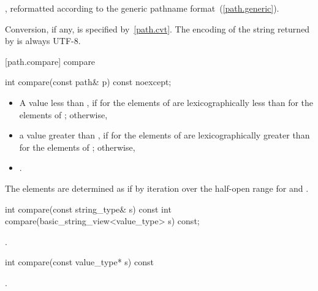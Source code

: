 \begin{itemdescr}
\pnum
\returns {}, reformatted according to the generic
pathname format~(\ref{path.generic}).

\pnum
\remarks Conversion, if any, is specified by~\ref{path.cvt}.
The encoding of the string returned by  is always
UTF-8.
\end{itemdescr}

[path.compare]{ compare}

%
\begin{itemdecl}
int compare(const path& p) const noexcept;
\end{itemdecl}

\begin{itemdescr}
\pnum
\returns
 \begin{itemize}
\item A value less than ,
  if  for the elements of 
  are lexicographically less than  for the elements of ;
  otherwise,
\item a value greater than ,
  if  for the elements of 
  are lexicographically greater than  for the elements of ;
  otherwise,
\item {}.
 \end{itemize}

\pnum
\remarks The elements are determined as if by iteration over the half-open
range  for  and .
\end{itemdescr}

%
\begin{itemdecl}
int compare(const string_type& s) const
int compare(basic_string_view<value_type> s) const;
\end{itemdecl}

\begin{itemdescr}
\pnum
\returns {}.
\end{itemdescr}

%
\begin{itemdecl}
int compare(const value_type* s) const
\end{itemdecl}

\begin{itemdescr}
\pnum
\returns {}.
\end{itemdescr}

